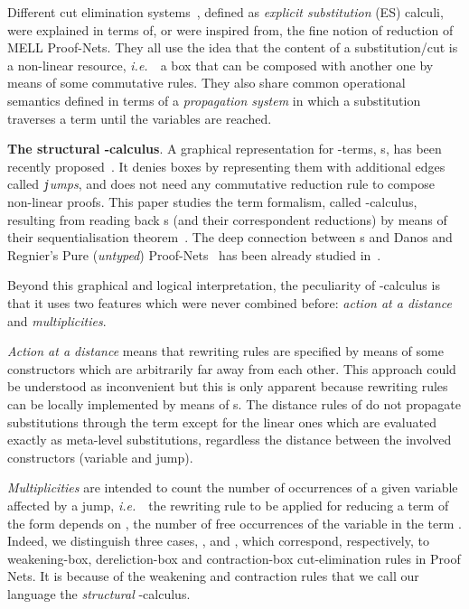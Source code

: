 \documentclass{LMCS}
\newcommand{\ie}{{\it  i.e.}~}
\renewcommand{\>}{\rightarrow}
\newcommand{\deft}[1]{{\bf #1}}
\begin{document}
Different cut elimination systems~\cite{DCKP03,KL07,Kes07}, defined as
\textit{explicit substitution} (ES) calculi, were explained in terms
of, or were inspired from, the fine notion of reduction of MELL
Proof-Nets. They all use the idea that the content of a
substitution/cut is a non-linear resource, \ie\ a box that can be
composed with another one by means of some commutative rules.
They also share common operational semantics defined in terms of
a \textit{propagation system} in which a substitution traverses a term
until the variables are reached.\medskip
  

\deft{The  structural -calculus}.  A graphical  representation for
-terms,  s, has  been  recently proposed~\cite{AG09}.   It
denies  boxes  by  representing  them  with  additional  edges  called
\textit{{\tt j}umps}, and does not need any commutative reduction rule
to  compose non-linear  proofs.  This  paper studies  the term
formalism,  called  -calculus,   resulting  from  reading  back
s  (and  their correspondent  reductions)  by  means of  their
sequentialisation  theorem~\cite{AG09}.  The  deep connection  between
s   and   Danos    and   Regnier's   Pure   (\textit{untyped})
Proof-Nets~\cite{Danos99opt}     has      been     already     studied
in~\cite{AccattoliTh}.

Beyond this  graphical and logical interpretation,  the peculiarity of
-calculus  is  that  it  uses  two 
features  which  were  never  combined before:  \textit{action  at  a
  distance} and \textit{multiplicities}.

\textit{Action at a distance} means
  that rewriting rules are specified by means of
  some constructors which are arbitrarily far away from each other. This
approach could be understood as inconvenient
but this is only apparent because rewriting rules can be
locally implemented by means of s. The distance rules of  do not propagate
substitutions through the term except
for the linear ones which are evaluated exactly as meta-level substitutions,
regardless the distance between the  involved constructors (variable and jump).

\textit{Multiplicities} are intended to count the number of
occurrences of a given variable affected by a jump,
  \ie\ the  rewriting rule to be applied for reducing a term of the
form  depends on , the number
  of free occurrences of the variable  in the term
  . Indeed, we distinguish three cases,
,  and , which
correspond, respectively,  to 
 weakening-box, dereliction-box and contraction-box
cut-elimination rules in Proof Nets.
It is because of the weakening and
contraction rules that we call our language the \textit{structural}
-calculus.\medskip
\end{document}
